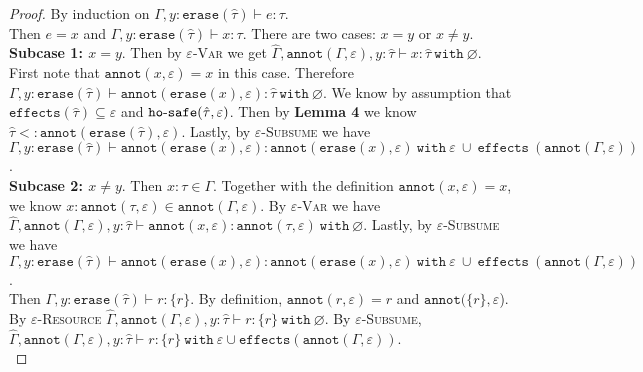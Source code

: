 \documentclass{llncs}
\newcommand{\keywadj}[1]{\mathtt{#1}}
\newcommand{\keyw}[1]{\keywadj{#1}~}
\newcommand{\kw}[1]{\keyw{ #1 }}
\newcommand{\kwa}[1]{\keywadj{ #1 }}
\newcommand{\hyphen}{\hbox{-}}
\begin{document}
\begin{proof}
By induction on $\Gamma, y: \kwa{erase}(\hat \tau) \vdash e: \tau$.\\

\noindent
{} Then $e=x$ and $\Gamma, y: \kwa{erase}(\hat \tau) \vdash x: \tau$. There are two cases: $x=y$ or $x \neq y$. \\

\noindent
\textbf{Subcase 1: $x = y$}. Then by \textsc{$\varepsilon$-Var} we get $\hat \Gamma, \kwa{annot}(\Gamma, \varepsilon), y: \hat \tau \vdash x: \hat \tau~\kw{with} \varnothing$. First note that $\kwa{annot}(x, \varepsilon) = x$ in this case. Therefore $\Gamma, y: \kwa{erase}(\hat \tau) \vdash \kwa{annot}(\kwa{erase}(x), \varepsilon): \hat \tau~\kw{with} \varnothing$. We know by assumption that $\kwa{effects}(\hat \tau) \subseteq \varepsilon$ and $\kwa{ho \hyphen safe}(\hat \tau, \varepsilon)$. Then by \textbf{Lemma 4} we know $\hat \tau <: \kwa{annot}(\kwa{erase}(\hat \tau), \varepsilon)$. Lastly, by \textsc{$\varepsilon$-Subsume} we have $\Gamma, y: \kwa{erase}(\hat \tau) \vdash \kwa{annot}(\kwa{erase}(x), \varepsilon): \kwa{annot}(\kwa{erase}(x), \varepsilon)~\kw{with} \varepsilon~\cup~\kw{effects}(\kwa{annot}(\Gamma, \varepsilon))$.\\

\noindent
\textbf{Subcase 2: $x \neq y$}. Then $x: \tau \in \Gamma$. Together with the definition $\kwa{annot}(x, \varepsilon) = x$, we know $x: \kwa{annot}(\tau, \varepsilon) \in \kwa{annot}(\Gamma, \varepsilon)$. By \textsc{$\varepsilon$-Var} we have $\hat \Gamma, \kwa{annot}(\Gamma, \varepsilon), y: \hat \tau \vdash \kwa{annot}(x, \varepsilon): \kwa{annot}(\tau, \varepsilon)~\kw{with} \varnothing$. Lastly, by \textsc{$\varepsilon$-Subsume} we have $\Gamma, y: \kwa{erase}(\hat \tau) \vdash \kwa{annot}(\kwa{erase}(x), \varepsilon): \kwa{annot}(\kwa{erase}(x), \varepsilon)~\kw{with} \varepsilon~\cup~\kw{effects}(\kwa{annot}(\Gamma, \varepsilon))$.\\

\noindent
{} Then $\Gamma, y: \kwa{erase}(\hat \tau) \vdash r : \{ r \}$. By definition, $\kwa{annot}(r, \varepsilon) = r$ and $\kwa{annot}(\{ r \}, \varepsilon$). By \textsc{$\varepsilon$-Resource}  $\hat \Gamma, \kwa{annot}(\Gamma, \varepsilon), y: \hat \tau \vdash r: \{ r \}~\kw{with} \varnothing$. By \textsc{$\varepsilon$-Subsume}, $\hat \Gamma, \kwa{annot}(\Gamma, \varepsilon), y: \hat \tau \vdash r: \{ r \}~\kw{with} \varepsilon \cup \kwa{effects}(\kwa{annot}(\Gamma, \varepsilon))$. \\


\end{proof}
\end{document}
